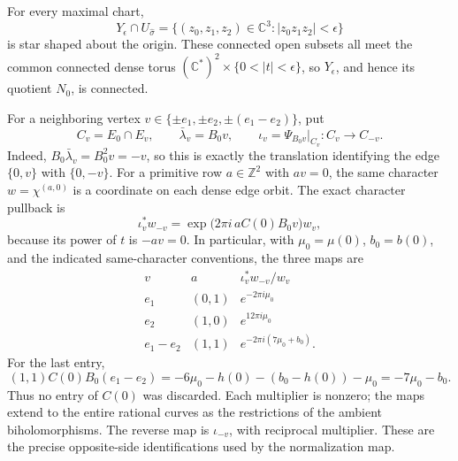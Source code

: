 For every maximal chart,
\[
 Y_\epsilon\cap U_{\widehat\sigma}
 =\{(z_0,z_1,z_2)\in\mathbb C^3:|z_0z_1z_2|<\epsilon\}
\]
is star shaped about the origin.  These connected open subsets all meet the
common connected dense torus
\((\mathbb C^*)^2\times\{0<|t|<\epsilon\}\), so \(Y_\epsilon\), and
hence its quotient \(N_0\), is connected.

For a neighboring vertex
\(v\in\{\pm e_1,\pm e_2,\pm(e_1-e_2)\}\), put
\[
 C_v=E_0\cap E_v,\qquad
 \bar\lambda_v=B_0v,\qquad
 \iota_v=\Psi_{B_0v}|_{C_v}:C_v\longrightarrow C_{-v}.
\]
Indeed, \(B_0\bar\lambda_v=B_0^2v=-v\), so this is exactly the
translation identifying the edge \(\{0,v\}\) with \(\{0,-v\}\).
For a primitive row \(a\in\mathbb Z^2\) with \(av=0\), the same
character \(w=\chi^{(a,0)}\) is a coordinate on each dense edge orbit.
The exact character pullback is
\[
 \iota_v^*w_{-v}
 =\exp\bigl(2\pi i\,aC(0)B_0v\bigr)w_v,
\]
because its power of \(t\) is \(-av=0\).  In particular, with
\(\mu_0=\mu(0)\), \(b_0=b(0)\), and the indicated same-character
conventions, the three maps are
\[
\begin{array}{c|c|c}
 v&a&\iota_v^*w_{-v}/w_v\\\hline
 e_1&(0,1)&e^{-2\pi i\mu_0}\\
 e_2&(1,0)&e^{12\pi i\mu_0}\\
 e_1-e_2&(1,1)&e^{-2\pi i(7\mu_0+b_0)}.
\end{array}
\]
For the last entry,
\[
 (1,1)C(0)B_0(e_1-e_2)
 =-6\mu_0-h(0)-(b_0-h(0))-\mu_0
 =-7\mu_0-b_0.
\]
Thus no entry of \(C(0)\) was discarded.  Each multiplier is nonzero;
the maps extend to the entire rational curves as the restrictions of the
ambient biholomorphisms.  The reverse map is \(\iota_{-v}\), with reciprocal
multiplier.  These are the precise opposite-side identifications used by
the normalization map.

